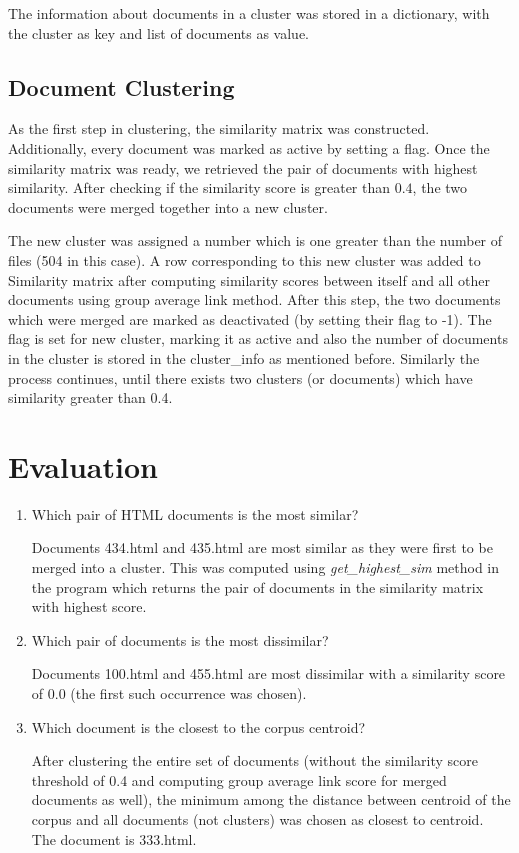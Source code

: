 \documentclass[paper=a4, fontsize=11pt]{scrartcl}
\numberwithin{equation}{section}		%
\numberwithin{figure}{section}			%
\numberwithin{table}{section}				%
\begin{document}
The information about documents in a cluster was stored in a dictionary, with the cluster as key and list of documents as value.

\subsection{Document Clustering}

As the first step in clustering, the similarity matrix was constructed. Additionally, every document was marked as active by setting a flag. Once the similarity matrix was ready, we retrieved the pair of documents with highest similarity. After checking if the similarity score is greater than $0.4$, the two documents were merged together into a new cluster.

The new cluster was assigned a number which is one greater than the number of files (504 in this case). A row corresponding to this new cluster was added to Similarity matrix after computing similarity scores between itself and all other documents using group average link method. After this step, the two documents which were merged are marked as deactivated (by setting their flag to -1). The flag is set for new cluster, marking it as active and also the number of documents in the cluster is stored in the cluster\_info as mentioned before. Similarly the process continues, until there exists two clusters (or documents) which have similarity greater than 0.4.

\section{Evaluation}

\begin{enumerate}
\item Which pair of HTML documents is the most similar? 

Documents 434.html and 435.html are most similar as they were first to be merged into a cluster. This was computed using \textit{get\_highest\_sim} method in the program which returns the pair of documents in the similarity matrix with highest score. 

\item Which pair of documents is the most dissimilar?
 
Documents 100.html and 455.html are most dissimilar with a similarity score of 0.0 (the first such occurrence was chosen).

\item Which document is the closest to the corpus centroid?

After clustering the entire set of documents (without the similarity score threshold of 0.4 and computing group average link score for merged documents as well), the minimum among the distance between centroid of the corpus and all documents (not clusters) was chosen as closest to centroid. The document is 333.html.  

\end{enumerate} 
\end{document}
